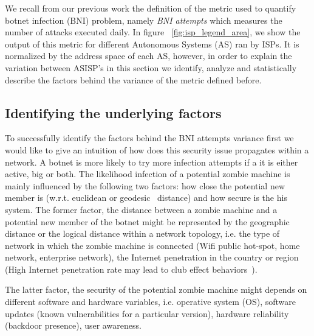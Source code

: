 


We recall from our previous work the definition of the metric used to quantify botnet infection (BNI) problem, namely \textit{BNI attempts} which measures the number of attacks executed daily. In figure ~\ref{fig:isp_legend_area}, we show the output of this metric for different Autonomous Systems (AS) ran by ISPs. It is normalized by the address space of each AS, however, in order to explain the variation between AS\/ISP's in this section we identify, analyze and statistically describe the factors behind the variance of the metric defined before.

\subsection{Identifying the underlying factors}
To successfully identify the factors behind the BNI attempts variance first we would like to give an intuition of how does this security issue propagates within a network. A botnet is more likely to try more infection attempts if a it is either active, big or both. The likelihood infection of a potential zombie machine is mainly influenced by the following two factors: how close the potential new member is (w.r.t. euclidean or geodesic~\cite{geodesic} distance) and how secure is the his system.
The former factor, the distance between a zombie machine and a potential new member of the botnet might be represented by the geographic distance or the logical distance within a network topology, i.e. the type of network in which the zombie machine is connected (Wifi public hot-spot, home network, enterprise network), the Internet penetration in the country or region (High Internet penetration rate may lead to club effect behaviors~\cite{club_effects}).

The latter factor, the security of the potential zombie machine might depends on different software and hardware variables, i.e. operative system (OS), software updates (known vulnerabilities for a particular version), hardware reliability (backdoor presence), user awareness.

